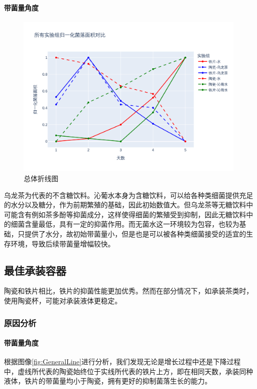 \documentclass[12pt,a4paper]{ctexart}
\begin{document}
\paragraph{带菌量角度}
\begin{figure}[H]  %
    \centering  %
    \includegraphics[width=\textwidth]{./plot/General/combined_normalized_line.png}  %
    \caption{总体折线图}  %
    \label{fig:GeneralLineFront}  %
\end{figure}
乌龙茶为代表的不含糖饮料。沁葡水本身为含糖饮料，可以给各种类细菌提供充足的水分以及糖分，作为前期繁殖的基础，因此初始数值大。但乌龙茶等无糖饮料中可能含有例如茶多酚等抑菌成分，这样使得细菌的繁殖受到抑制，因此无糖饮料中的细菌含量最低，具有一定的抑菌作用。而无菌水这一环境较为包容，也较为基础，只提供了水分，故初始带菌量小，但是也是可以被各种类细菌接受的适宜的生存环境，导致后续带菌量增幅较快。

\subsection{最佳承装容器}
陶瓷和铁片相比，铁片的抑菌性能更加优秀。然而在部分情况下，如承装茶类时，使用陶瓷杯，可能对承装液体更稳定。

\subsubsection{原因分析}
\paragraph{带菌量角度}
根据图像\ref{fig:GeneralLine}进行分析，我们发现无论是增长过程中还是下降过程中，虚线所代表的陶瓷始终位于实线所代表的铁片上方，即在相同天数，承装同种液体，铁片的带菌量均小于陶瓷，拥有更好的抑制菌落生长的能力。
\end{document}
